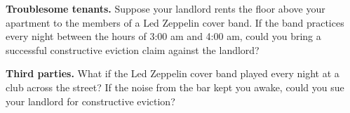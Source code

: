 \item \textbf{Troublesome tenants.}  Suppose your landlord rents the floor above
your apartment to the members of a Led Zeppelin cover band.  If the band
practices every night between the hours of 3:00 am and 4:00 am, could you bring
a successful constructive eviction claim against the landlord? 


\item \textbf{Third parties.} What if the Led Zeppelin cover band
played every night at a club across the street?  If the noise from the bar kept
you awake, could you sue your landlord for constructive eviction?

